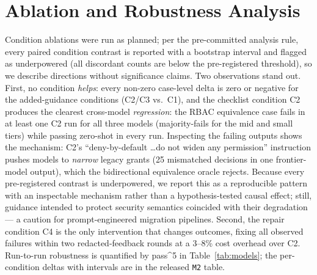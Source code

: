 \documentclass[journal]{IEEEtran}
\begin{document}
\section{Ablation and Robustness Analysis}
\label{sec:ablation}
Condition ablations were run as planned; per the pre-committed analysis rule, every paired
condition contrast is reported with a bootstrap interval and flagged as underpowered (all
discordant counts are below the pre-registered threshold), so we describe directions without
significance claims. Two observations stand out. First, no condition \emph{helps}: every
non-zero case-level delta is zero or negative for the added-guidance conditions (C2/C3 vs.\
C1), and the checklist condition C2 produces the clearest cross-model \emph{regression}: the RBAC
equivalence case fails in at least one C2 run for all three models (majority-fails for the
mid and small tiers) while passing zero-shot in every run. Inspecting
the failing outputs shows the mechanism: C2's ``deny-by-default \ldots do not widen any permission'' instruction
pushes models to \emph{narrow} legacy grants (25 mismatched decisions in one frontier-model
output), which the bidirectional equivalence oracle rejects. Because every pre-registered contrast is underpowered, we report this as a reproducible
pattern with an inspectable mechanism rather than a hypothesis-tested causal effect; still,
guidance intended to protect security semantics coincided with their degradation --- a
caution for prompt-engineered migration pipelines.
Second, the repair condition C4 is the only intervention that changes outcomes, fixing all
observed failures within two redacted-feedback rounds at a 3--8\% cost overhead over C2. Run-to-run
robustness is quantified by pass\textasciicircum{}5 in Table~\ref{tab:models}; the
per-condition deltas with intervals are in the released \texttt{M2} table.
\end{document}

